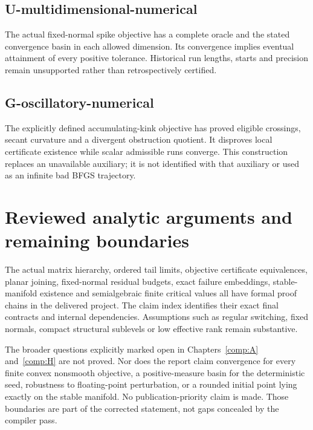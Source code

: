 

\subsection{U-multidimensional-numerical}\label{u-multidimensional-numerical}

The actual fixed-normal spike objective has a complete oracle and the stated convergence basin in each allowed dimension. Its convergence implies eventual attainment of every positive tolerance. Historical run lengths, starts and precision remain unsupported rather than retrospectively certified.



\subsection{G-oscillatory-numerical}\label{g-oscillatory-numerical}

The explicitly defined accumulating-kink objective has proved eligible crossings, secant curvature and a divergent obstruction quotient. It disproves local certificate existence while scalar admissible runs converge. This construction replaces an unavailable auxiliary; it is not identified with that auxiliary or used as an infinite bad BFGS trajectory.



\section{Reviewed analytic arguments and remaining boundaries}\label{analytic-steps-that-still-require-independent-review}

The actual matrix hierarchy, ordered tail limits, objective certificate equivalences, planar joining, fixed-normal residual budgets, exact failure embeddings, stable-manifold existence and semialgebraic finite critical values all have formal proof chains in the delivered project. The claim index identifies their exact final contracts and internal dependencies. Assumptions such as regular switching, fixed normals, compact structural sublevels or low effective rank remain substantive.

The broader questions explicitly marked open in Chapters~\ref{comp:A} and~\ref{comp:H} are not proved. Nor does the report claim convergence for every finite convex nonsmooth objective, a positive-measure basin for the deterministic seed, robustness to floating-point perturbation, or a rounded initial point lying exactly on the stable manifold. No publication-priority claim is made. Those boundaries are part of the corrected statement, not gaps concealed by the compiler pass.


